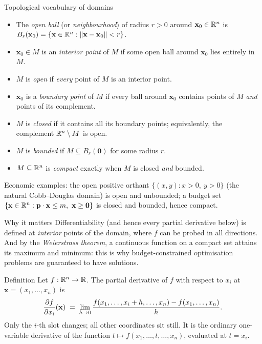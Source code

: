\begin{rulebox}{Topological vocabulary of domains}
\begin{itemize}[leftmargin=1.6em,itemsep=0.3ex]
  \item The \emph{open ball} (or \emph{neighbourhood}) of radius $r>0$ around $\mathbf{x}_0\in\mathbb{R}^n$ is
        $B_r(\mathbf{x}_0)=\{\mathbf{x}\in\mathbb{R}^n :
        \|\mathbf{x}-\mathbf{x}_0\|<r\}$.
  \item $\mathbf{x}_0\in M$ is an \emph{interior point} of $M$ if some open ball around
        $\mathbf{x}_0$ lies entirely in $M$.
  \item $M$ is \emph{open} if \emph{every} point of $M$ is
        an interior point.
  \item $\mathbf{x}_0$ is a \emph{boundary point} of
        $M$ if every ball around $\mathbf{x}_0$ contains points of $M$
        \emph{and} points of its complement.
  \item $M$ is \emph{closed} if it contains all
        its boundary points; equivalently, the complement
        $\mathbb{R}^n\setminus M$ is open.
  \item $M$ is \emph{bounded} if
        $M\subseteq B_r(\mathbf{0})$ for some radius $r$.
  \item $M\subseteq\mathbb{R}^n$ is \emph{compact} exactly when
        $M$ is closed \emph{and} bounded.
\end{itemize}
Economic examples: the open positive orthant $\{(x,y): x>0,\ y>0\}$
(the natural Cobb--Douglas domain) is open and unbounded; a budget set
$\{\mathbf{x}\in\mathbb{R}^n : \mathbf{p}\cdot\mathbf{x}\le m,\
\mathbf{x}\ge\mathbf{0}\}$ is closed and bounded, hence compact.
\end{rulebox}

\begin{rulebox}{Why it matters}
Differentiability (and hence every partial derivative below) is
defined at \emph{interior} points of the domain, where $f$ can be
probed in all directions. And by the \emph{Weierstrass theorem}, a
continuous function on a compact set attains its maximum and minimum:
this is why budget-constrained optimisation problems are
guaranteed to have solutions.
\end{rulebox}

\begin{rulebox}{Definition}
Let $f:\mathbb{R}^n\to\mathbb{R}$. The partial derivative of $f$ with respect to $x_i$ at
$\mathbf{x}=(x_1,\ldots,x_n)$ is
\[
  \frac{\partial f}{\partial x_i}(\mathbf{x}) \;=\; \lim_{h\to0}
    \frac{f(x_1,\ldots,x_i+h,\ldots,x_n)-f(x_1,\ldots,x_n)}{h} .
\]
Only the $i$-th slot changes; all other coordinates sit still. It is the
ordinary one-variable derivative of the function
$t\mapsto f(x_1,\ldots,t,\ldots,x_n)$, evaluated at $t=x_i$.
\end{rulebox}

